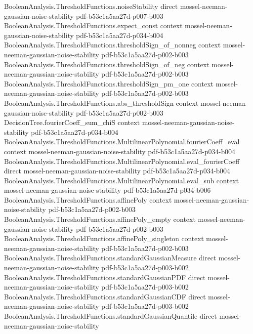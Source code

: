 \begin{theorem}
\proofstep
  {BooleanAnalysis.ThresholdFunctions.noiseStability}
  {direct}
  {mossel-neeman-gaussian-noise-stability}
  {pdf-b53c1a5aa27d-p007-b003}
\proofstep
  {BooleanAnalysis.ThresholdFunctions.expect_const}
  {context}
  {mossel-neeman-gaussian-noise-stability}
  {pdf-b53c1a5aa27d-p034-b004}
\proofstep
  {BooleanAnalysis.ThresholdFunctions.thresholdSign_of_nonneg}
  {context}
  {mossel-neeman-gaussian-noise-stability}
  {pdf-b53c1a5aa27d-p002-b003}
\proofstep
  {BooleanAnalysis.ThresholdFunctions.thresholdSign_of_neg}
  {context}
  {mossel-neeman-gaussian-noise-stability}
  {pdf-b53c1a5aa27d-p002-b003}
\proofstep
  {BooleanAnalysis.ThresholdFunctions.thresholdSign_pm_one}
  {context}
  {mossel-neeman-gaussian-noise-stability}
  {pdf-b53c1a5aa27d-p002-b003}
\proofstep
  {BooleanAnalysis.ThresholdFunctions.abs_thresholdSign}
  {context}
  {mossel-neeman-gaussian-noise-stability}
  {pdf-b53c1a5aa27d-p002-b003}
\proofstep
  {DecisionTree.fourierCoeff_sum_chiS}
  {context}
  {mossel-neeman-gaussian-noise-stability}
  {pdf-b53c1a5aa27d-p034-b004}
\proofstep
  {BooleanAnalysis.ThresholdFunctions.MultilinearPolynomial.fourierCoeff_eval}
  {context}
  {mossel-neeman-gaussian-noise-stability}
  {pdf-b53c1a5aa27d-p034-b004}
\proofstep
  {BooleanAnalysis.ThresholdFunctions.MultilinearPolynomial.eval_fourierCoeff}
  {direct}
  {mossel-neeman-gaussian-noise-stability}
  {pdf-b53c1a5aa27d-p034-b004}
\proofstep
  {BooleanAnalysis.ThresholdFunctions.MultilinearPolynomial.eval_sub}
  {context}
  {mossel-neeman-gaussian-noise-stability}
  {pdf-b53c1a5aa27d-p034-b006}
\proofstep
  {BooleanAnalysis.ThresholdFunctions.affinePoly}
  {context}
  {mossel-neeman-gaussian-noise-stability}
  {pdf-b53c1a5aa27d-p002-b003}
\proofstep
  {BooleanAnalysis.ThresholdFunctions.affinePoly_empty}
  {context}
  {mossel-neeman-gaussian-noise-stability}
  {pdf-b53c1a5aa27d-p002-b003}
\proofstep
  {BooleanAnalysis.ThresholdFunctions.affinePoly_singleton}
  {context}
  {mossel-neeman-gaussian-noise-stability}
  {pdf-b53c1a5aa27d-p002-b003}
\proofstep
  {BooleanAnalysis.ThresholdFunctions.standardGaussianMeasure}
  {direct}
  {mossel-neeman-gaussian-noise-stability}
  {pdf-b53c1a5aa27d-p003-b002}
\proofstep
  {BooleanAnalysis.ThresholdFunctions.standardGaussianPDF}
  {direct}
  {mossel-neeman-gaussian-noise-stability}
  {pdf-b53c1a5aa27d-p003-b002}
\proofstep
  {BooleanAnalysis.ThresholdFunctions.standardGaussianCDF}
  {direct}
  {mossel-neeman-gaussian-noise-stability}
  {pdf-b53c1a5aa27d-p003-b002}
\proofstep
  {BooleanAnalysis.ThresholdFunctions.standardGaussianQuantile}
  {direct}
  {mossel-neeman-gaussian-noise-stability}

\end{theorem}
